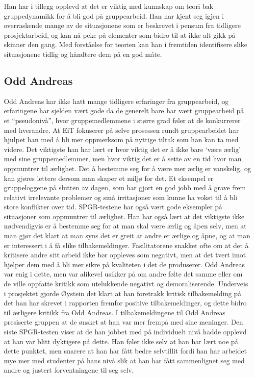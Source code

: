 \documentclass[a4paper,norsk,oneside]{article}
\begin{document}
Han har i tillegg opplevd at det er viktig med kunnskap om teori bak gruppedynamikk for å bli god på gruppearbeid. Han har kjent seg igjen i overraskende mange av de situasjonene som er beskrevet i pensum fra tidligere prosjektarbeid, og kan nå peke på elementer som bidro til at ikke alt gikk på skinner den gang. Med forståelse for teorien kan han i fremtiden identifisere slike situasjonene tidlig og håndtere dem på en god måte.

\subsection{Odd Andreas} 
Odd Andreas har ikke hatt mange tidligere erfaringer fra gruppearbeid, og erfaringene har sjelden vært gode da de generelt bare har vært gruppearbeid på et “pseudonivå”, hvor gruppemedlemmene i større grad føler at de konkurrerer med hverandre. At EiT fokuserer på selve prosessen rundt gruppearbeidet har hjulpet han med å bli mer oppmerksom på nyttige tiltak som han kan ta med videre.
Det viktigste han har lært er hvor viktig det er å ikke bare ‘være ærlig’ med sine gruppemedlemmer, men hvor viktig det er å sette av en tid hvor man oppmuntrer til ærlighet. Det å bestemme seg for å være mer ærlig er vanskelig, og kan gjøres lettere dersom man skaper et miljø for det. Et eksempel er gruppeloggene på slutten av dagen, som har gjort en god jobb med å grave frem relativt irrelevante problemer og små irritasjoner som kunne ha vokst til å bli store konflikter over tid. SPGR-testene har også vært gode eksempler på situasjoner som oppmuntrer til ærlighet. Han har også lært at det viktigste ikke nødvendigvis er å bestemme seg for at man skal være ærlig og åpen selv, men at man gjør det klart at man syns det er greit at andre er ærlige og åpne, og at man er interessert i å få slike tilbakemeldinger. Fasilitatorene snakket ofte om at det å kritisere andre sitt arbeid ikke bør oppleves som negativt, men at det tvert imot hjelper dem med å bli mer sikre på kvaliteten i det de produserer. Odd Andreas var enig i dette, men var alikevel usikker på om andre følte det samme eller om de ville oppfatte kritikk som utelukkende negativt og demoraliserende. Underveis i prosjektet gjorde Øystein det klart at han foretrakk kritisk tilbakemelding på det han har skrevet i rapporten fremfor positive tilbakemeldinger, og dette bidro til ærligere kritikk fra Odd Andreas.
I tilbakemeldingene til Odd Andreas presiserte gruppen at de ønsket at han var mer frempå med sine meninger. Den siste SPGR-testen viser at de han jobbet med på individuelt nivå hadde opplevd at han var blitt dyktigere på dette. Han føler ikke selv at han har lært noe på dette punktet, men snarere at han har fått bedre selvtillit fordi han har arbeidet mye mer med studenter på hans nivå slik at han har fått sammenlignet seg med andre og justert forventningene til seg selv.
\end{document}
